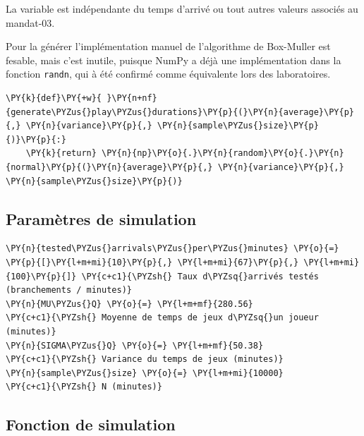 La variable est indépendante du temps d'arrivé ou tout autres valeurs
associés au mandat-03.

Pour la générer l'implémentation manuel de l'algorithme de Box-Muller
est fesable, mais c'est inutile, puisque NumPy a déjà une implémentation
dans la fonction \texttt{randn}, qui à été confirmé comme équivalente
lors des laboratoires.

    \begin{tcolorbox}[breakable, size=fbox, boxrule=1pt, pad at break*=1mm,colback=cellbackground, colframe=cellborder]
\begin{Verbatim}[commandchars=\\\{\}]
\PY{k}{def}\PY{+w}{ }\PY{n+nf}{generate\PYZus{}play\PYZus{}durations}\PY{p}{(}\PY{n}{average}\PY{p}{,} \PY{n}{variance}\PY{p}{,} \PY{n}{sample\PYZus{}size}\PY{p}{)}\PY{p}{:}
    \PY{k}{return} \PY{n}{np}\PY{o}{.}\PY{n}{random}\PY{o}{.}\PY{n}{normal}\PY{p}{(}\PY{n}{average}\PY{p}{,} \PY{n}{variance}\PY{p}{,} \PY{n}{sample\PYZus{}size}\PY{p}{)}
\end{Verbatim}
\end{tcolorbox}

    \subsection{Paramètres de simulation}\label{paramuxe8tres-de-simulation}

    \begin{tcolorbox}[breakable, size=fbox, boxrule=1pt, pad at break*=1mm,colback=cellbackground, colframe=cellborder]
\begin{Verbatim}[commandchars=\\\{\}]
\PY{n}{tested\PYZus{}arrivals\PYZus{}per\PYZus{}minutes} \PY{o}{=} \PY{p}{[}\PY{l+m+mi}{10}\PY{p}{,} \PY{l+m+mi}{67}\PY{p}{,} \PY{l+m+mi}{100}\PY{p}{]} \PY{c+c1}{\PYZsh{} Taux d\PYZsq{}arrivés testés (branchements / minutes)}
\PY{n}{MU\PYZus{}Q} \PY{o}{=} \PY{l+m+mf}{280.56}                               \PY{c+c1}{\PYZsh{} Moyenne de temps de jeux d\PYZsq{}un joueur (minutes)}
\PY{n}{SIGMA\PYZus{}Q} \PY{o}{=} \PY{l+m+mf}{50.38}                             \PY{c+c1}{\PYZsh{} Variance du temps de jeux (minutes)}
\PY{n}{sample\PYZus{}size} \PY{o}{=} \PY{l+m+mi}{10000}                         \PY{c+c1}{\PYZsh{} N (minutes)}
\end{Verbatim}
\end{tcolorbox}

    \subsection{Fonction de simulation}\label{fonction-de-simulation}

